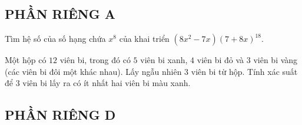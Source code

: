 \subsection*{PHẦN RIÊNG A} 
\begin{bt}%
	Tìm hệ số của số hạng chứa $x^8$ của khai triển $ \displaystyle\left(8x^2-7x \right)\displaystyle\left(7+8x\right)^{18}$.
	
\end{bt}
\begin{bt}%
	Một hộp có $12$ viên bi, trong đó có $5$ viên bi xanh, $4$ viên bi đỏ và $3$ viên bi vàng (các viên bi đôi một khác nhau). Lấy ngẫu nhiên $3$ viên bi từ hộp. Tính xác suất để $3$ viên bi lấy ra có ít nhất hai viên bi  màu xanh. 
	
\end{bt}


\subsection*{PHẦN RIÊNG D} 

